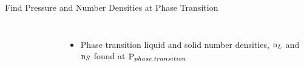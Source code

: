 \documentclass{beamer}
\begin{document}
\begin{frame}{Find Pressure and Number Densities at  Phase Transition}
\begin{columns}[t]
\begin{figure}
            \end{figure}
            \vspace{-.5em}
			\begin{itemize} 						
			    \item Phase transition liquid and solid number densities, $\text n_L$ and $\text n_S$ found at $\text P_{phase.transition}$
			\end{itemize}
            
	\end{columns}	
\end{frame}

		
		
\end{document}
